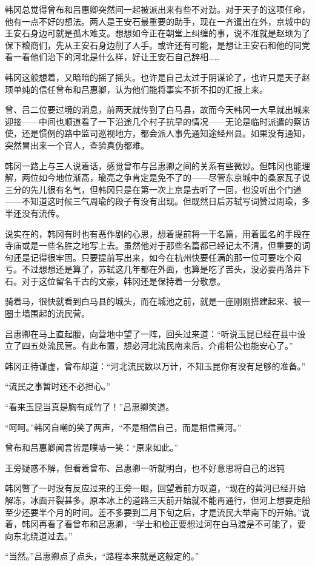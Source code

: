 韩冈总觉得曾布和吕惠卿突然间一起被派出来有些不对劲。对于天子的这项任命，他有一点不好的想法。两人是王安石最重要的助手，现在一齐遣出在外，京城中的王安石身边可就是孤木难支。想想如今正在朝堂上纠缠的事，说不准就是赵顼为了保下粮商们，先从王安石身边削了人手。或许还有可能，是想让王安石和他的同党看一看他们治下的河北是什么样，好让王安石自己辞相……

韩冈这般想着，又暗暗的摇了摇头。也许是自己太过于阴谋论了，也许只是天子赵顼单纯的信任曾布和吕惠卿，认为他们能将事实不折不扣的汇报上来。

曾、吕二位要过境的消息，前两天就传到了白马县，故而今天韩冈一大早就出城来迎接——中间也顺道看了一下沿途几个村子抗旱的情况——无论是临时派遣的察访使，还是惯例的路中监司巡视地方，都会派人事先通知途经州县。如果没有通知，突然冒出来一个官人，查验真伪都难。

韩冈一路上与三人说着话，感觉曾布与吕惠卿之间的关系有些微妙。但韩冈也能理解，两位如今地位渐髙，瑜亮之争肯定是免不了的——尽管东京城中的桑家瓦子说三分的先儿很有名气，但韩冈只是在第一次上京是去听了一回，也没听出个门道——不知道这时候三气周瑜的段子有没有出现。但既然日后苏轼写词赞过周瑜，多半还没有流传。

说实在的，韩冈有时也有恶作剧的心思，想着提前将一干名篇，用着匿名的手段在寺庙或是一些名胜之地写上去。虽然他对于那些名篇都已经记太不清，但重要的词句还是记得很牢固。只要提前写出来，如今在杭州快要任满的那一位可要吃个闷亏。不过想想还是算了，苏轼这几年都在外面，也算是吃了苦头，没必要再落井下石。对于这位留名千古的文豪，韩冈还是保持着一分敬意。

骑着马，很快就看到白马县的城头，而在城池之前，就是一座刚刚搭建起来、被一圈土墙围起的流民营。

吕惠卿在马上直起腰，向营地中望了一阵，回头过来道：“听说玉昆已经在县中设立了四五处流民营。有此布置，想必河北流民南来后，介甫相公也能安心了。”

韩冈正待谦虚，曾布却道：“河北流民数以万计，不知玉昆你有没有足够的准备。”

“流民之事暂时还不必担心。”

“看来玉昆当真是胸有成竹了！”吕惠卿笑道。

“呵呵。”韩冈自嘲的笑了两声，“不是相信自己，而是相信黄河。”

曾布和吕惠卿闻言皆是噗哧一笑：“原来如此。”

王旁疑惑不解，但看着曾布、吕惠卿一听就明白，也不好意思将自己的迟钝

韩冈瞥了一时没有反应过来的王旁一眼，回望着前方叹道，“现在的黄河已经开始解冻，冰面开裂甚多。原本冰上的道路三天前开始就不能再通行，但河上想要走船至少还要半个月的时间。差不多要到二月下旬之后，才是流民大举南下的开始。”说着，韩冈再看了看曾布和吕惠卿，“学士和检正要想过河在白马渡是不可能了，要向东北绕道过去。”

“当然。”吕惠卿点了点头，“路程本来就是这般定的。”

